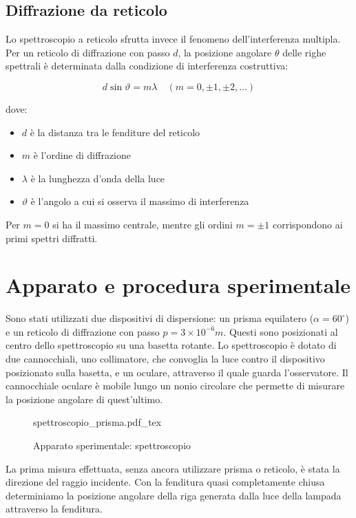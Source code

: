 \documentclass[9pt,a4paper,twocolumn,twoside]{tau-class/tau}
\newcommand{\incfig}[1]{%
	{#1.pdf_tex}
}
\begin{document}
\subsection*{Diffrazione da reticolo}
Lo spettroscopio a reticolo sfrutta invece il fenomeno dell'interferenza multipla. Per un reticolo di diffrazione con passo $d$, la posizione angolare $\theta$ delle righe spettrali è determinata dalla condizione di interferenza costruttiva:

\begin{equation}
d\sin\vartheta = m\lambda \quad (m = 0, \pm 1, \pm 2, \dots)
\end{equation}

dove:
\begin{itemize}
\item $d$ è la distanza tra le fenditure del reticolo
\item $m$ è l'ordine di diffrazione
\item $\lambda$ è la lunghezza d'onda della luce
\item $\vartheta$ è l'angolo a cui si osserva il massimo di interferenza
\end{itemize}

Per $m=0$ si ha il massimo centrale, mentre gli ordini $m=\pm1$ corrispondono ai primi spettri diffratti. %


\section{Apparato e procedura sperimentale}
Sono stati utilizzati due dispositivi di dispersione: un prisma equilatero (\(\alpha = 60^\circ\)) e un reticolo di diffrazione con passo \(p = 3\times 10^{-6} m\). Questi sono posizionati al centro dello spettroscopio su una basetta rotante.
Lo spettroscopio è dotato di due cannocchiali, uno collimatore, che convoglia la luce contro il dispositivo posizionato sulla basetta, e un oculare, attraverso il quale guarda l'osservatore. Il cannocchiale oculare è mobile lungo un nonio circolare che permette di misurare la posizione angolare di quest'ultimo.

\begin{figure}[H]
    \centering
    \footnotesize
    \incfig{spettroscopio_prisma}
    \caption{Apparato sperimentale: spettroscopio}
\end{figure}

La prima misura effettuata, senza ancora utilizzare prisma o reticolo, è stata la direzione del raggio incidente. Con la fenditura quasi completamente chiusa determiniamo la posizione angolare della riga generata dalla luce della lampada attraverso la fenditura. 
\end{document}
